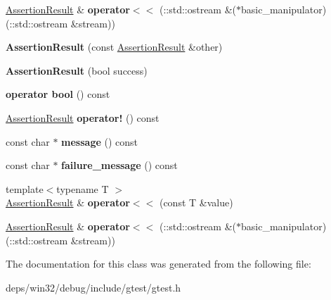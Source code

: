 \begin{DoxyCompactItemize}
\item 
\hypertarget{classtesting_1_1_assertion_result_a43ae8a260843ce2ff3dc9af262672b8b}{}\hyperlink{classtesting_1_1_assertion_result}{Assertion\+Result} \& {\bfseries operator$<$$<$} (\+::std\+::ostream \&($\ast$basic\+\_\+manipulator)(\+::std\+::ostream \&stream))\label{classtesting_1_1_assertion_result_a43ae8a260843ce2ff3dc9af262672b8b}

\item 
\hypertarget{classtesting_1_1_assertion_result_a27788116f03f90aec4daf592fd809ead}{}{\bfseries Assertion\+Result} (const \hyperlink{classtesting_1_1_assertion_result}{Assertion\+Result} \&other)\label{classtesting_1_1_assertion_result_a27788116f03f90aec4daf592fd809ead}

\item 
\hypertarget{classtesting_1_1_assertion_result_ade695178c05c4b2f82e92930c912fc25}{}{\bfseries Assertion\+Result} (bool success)\label{classtesting_1_1_assertion_result_ade695178c05c4b2f82e92930c912fc25}

\item 
\hypertarget{classtesting_1_1_assertion_result_af85b7852e6399467cd74df539810abcd}{}{\bfseries operator bool} () const \label{classtesting_1_1_assertion_result_af85b7852e6399467cd74df539810abcd}

\item 
\hypertarget{classtesting_1_1_assertion_result_a85301ba52aa1efe89b79d1e3b59160cd}{}\hyperlink{classtesting_1_1_assertion_result}{Assertion\+Result} {\bfseries operator!} () const \label{classtesting_1_1_assertion_result_a85301ba52aa1efe89b79d1e3b59160cd}

\item 
\hypertarget{classtesting_1_1_assertion_result_ab20c91eba13e20f1b4ad89e3d15f69a8}{}const char $\ast$ {\bfseries message} () const \label{classtesting_1_1_assertion_result_ab20c91eba13e20f1b4ad89e3d15f69a8}

\item 
\hypertarget{classtesting_1_1_assertion_result_ae54fa82506c507a9dbc0f85d2cec652a}{}const char $\ast$ {\bfseries failure\+\_\+message} () const \label{classtesting_1_1_assertion_result_ae54fa82506c507a9dbc0f85d2cec652a}

\item 
\hypertarget{classtesting_1_1_assertion_result_a3230efa81aafe7c61f5fb878cfa39e91}{}{\footnotesize template$<$typename T $>$ }\\\hyperlink{classtesting_1_1_assertion_result}{Assertion\+Result} \& {\bfseries operator$<$$<$} (const T \&value)\label{classtesting_1_1_assertion_result_a3230efa81aafe7c61f5fb878cfa39e91}

\item 
\hypertarget{classtesting_1_1_assertion_result_a43ae8a260843ce2ff3dc9af262672b8b}{}\hyperlink{classtesting_1_1_assertion_result}{Assertion\+Result} \& {\bfseries operator$<$$<$} (\+::std\+::ostream \&($\ast$basic\+\_\+manipulator)(\+::std\+::ostream \&stream))\label{classtesting_1_1_assertion_result_a43ae8a260843ce2ff3dc9af262672b8b}

\end{DoxyCompactItemize}


The documentation for this class was generated from the following file\+:\begin{DoxyCompactItemize}
\item 
deps/win32/debug/include/gtest/gtest.\+h\end{DoxyCompactItemize}
